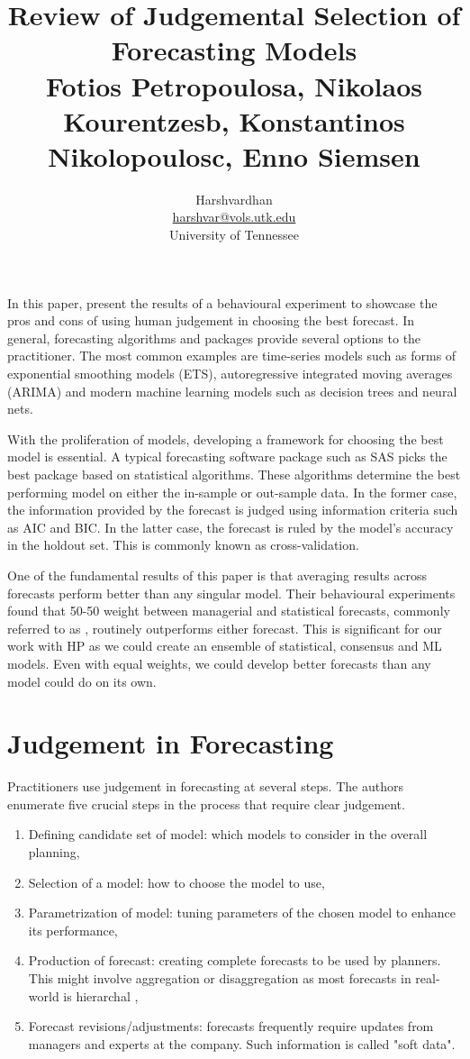 \documentclass[12pt]{article}
\title{Review of Judgemental Selection of Forecasting Models \\
\small Fotios Petropoulosa, Nikolaos Kourentzesb, Konstantinos Nikolopoulosc, Enno Siemsen}
\author{Harshvardhan \\ \href{mailto:harshvar@vols.utk.edu}{harshvar@vols.utk.edu} \\ University of Tennessee}
\begin{document}
\maketitle

In this paper, \cite{petropoulos2018judgmental} present the results of a behavioural experiment to showcase the pros and cons of using human judgement in choosing the best forecast. In general, forecasting algorithms and packages provide several options to the practitioner. The most common examples are time-series models such as forms of exponential smoothing models (ETS), autoregressive integrated moving averages (ARIMA) and modern machine learning models such as decision trees and neural nets.

With the proliferation of models, developing a framework for choosing the best model is essential. A typical forecasting software package such as SAS picks the best package based on statistical algorithms. These algorithms determine the best performing model on either the in-sample or out-sample data. In the former case, the information provided by the forecast is judged using information criteria such as AIC and BIC. In the latter case, the forecast is ruled by the model's accuracy in the holdout set. This is commonly known as cross-validation.

One of the fundamental results of this paper is that averaging results across forecasts perform better than any singular model. Their behavioural experiments found that 50-50 weight between managerial and statistical forecasts, commonly referred to as \cite{blattberg1990database}, routinely outperforms either forecast. This is significant for our work with HP as we could create an ensemble of statistical, consensus and ML models. Even with equal weights, we could develop better forecasts than any model could do on its own.

\section{Judgement in Forecasting}

Practitioners use judgement in forecasting at several steps. The authors enumerate five crucial steps in the process that require clear judgement.

\begin{enumerate}
	\item Defining candidate set of model: which models to consider in the overall planning,
	\item Selection of a model: how to choose the model to use,
	\item Parametrization of model: tuning parameters of the chosen model to enhance its performance,
	\item Production of forecast: creating complete forecasts to be used by planners. This might involve aggregation or disaggregation as most forecasts in real-world is hierarchal \citep{abolghasemi2019},
	\item Forecast revisions/adjustments: forecasts frequently require updates from managers and experts at the company. Such information is called "soft data".
\end{enumerate}
	
\end{document}
